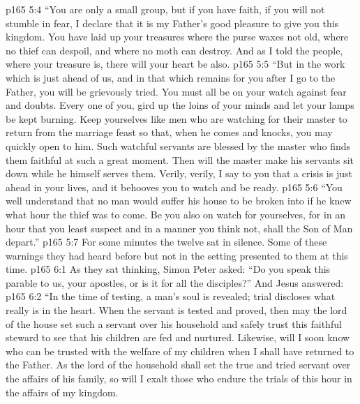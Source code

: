 \vs p165 5:4 \textcolor{ubdarkred}{“You are only a small group, but if you have faith, if you will not stumble in fear, I declare that it is my Father’s good pleasure to give you this kingdom. You have laid up your treasures where the purse waxes not old, where no thief can despoil, and where no moth can destroy. And as I told the people, where your treasure is, there will your heart be also.}
\vs p165 5:5 \textcolor{ubdarkred}{“But in the work which is just ahead of us, and in that which remains for you after I go to the Father, you will be grievously tried. You must all be on your watch against fear and doubts. Every one of you, gird up the loins of your minds and let your lamps be kept burning. Keep yourselves like men who are watching for their master to return from the marriage feast so that, when he comes and knocks, you may quickly open to him. Such watchful servants are blessed by the master who finds them faithful at such a great moment. Then will the master make his servants sit down while he himself serves them. Verily, verily, I say to you that a crisis is just ahead in your lives, and it behooves you to watch and be ready.}
\vs p165 5:6 \textcolor{ubdarkred}{“You well understand that no man would suffer his house to be broken into if he knew what hour the thief was to come. Be you also on watch for yourselves, for in an hour that you least suspect and in a manner you think not, shall the Son of Man depart.”}
\pc \vs p165 5:7 For some minutes the twelve sat in silence. Some of these warnings they had heard before but not in the setting presented to them at this time.\plusone
{}
\vs p165 6:1 As they sat thinking, Simon Peter asked: “Do you speak this parable to us, your apostles, or is it for all the disciples?” And Jesus answered:
\pc \vs p165 6:2 \textcolor{ubdarkred}{“In the time of testing, a man’s soul is revealed; trial discloses what really is in the heart. When the servant is tested and proved, then may the lord of the house set such a servant over his household and safely trust this faithful steward to see that his children are fed and nurtured. Likewise, will I soon know who can be trusted with the welfare of my children when I shall have returned to the Father. As the lord of the household shall set the true and tried servant over the affairs of his family, so will I exalt those who endure the trials of this hour in the affairs of my kingdom.}\plusone
